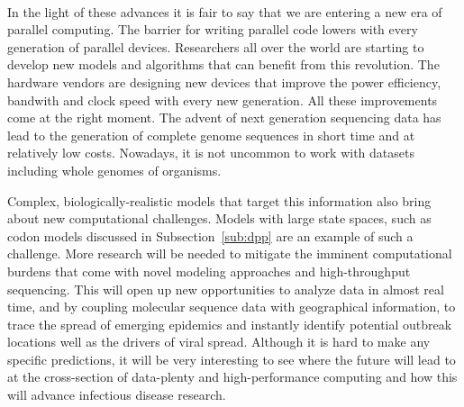 \paragraph{}
In the light of these advances it is fair to say that we are entering a new era of parallel computing.
The barrier for writing parallel code lowers with every generation of parallel devices.
Researchers all over the world are starting to develop new models and algorithms that can benefit from this revolution.
The hardware vendors are designing new devices that improve the power efficiency, bandwith and clock speed with every new generation.
All these improvements come at the right moment.
The advent of next generation sequencing data has lead to the generation of complete genome sequences in short time and at relatively low costs.
Nowadays, it is not uncommon to work with datasets including whole genomes of organisms.

Complex, biologically-realistic models that target this information also bring about new computational challenges.
Models with large state spaces, such as codon models discussed in Subsection~\ref{sub:dpp} are an example of such a challenge.
More research will be needed to mitigate the imminent computational burdens that come with novel modeling approaches and high-throughput sequencing. 
This will open up new opportunities to analyze data in almost real time, and by coupling molecular sequence data with geographical information, to trace the spread of emerging epidemics and instantly identify potential outbreak locations well as the drivers of viral spread.  
Although it is hard to make any specific predictions, it will be very interesting to see where the future will lead to at the cross-section of data-plenty and high-performance computing and how this will advance infectious disease research.

















